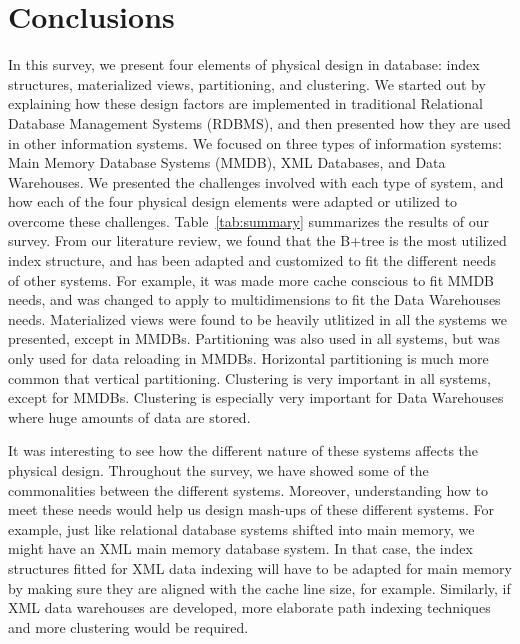 \documentclass[12pt,a4paper]{article}
\begin{document}
\section{Conclusions}
\label{SEC-CONCL}

In this survey, we present four elements of physical design in database: index structures, materialized views, partitioning, and clustering. We started out
by explaining how these design factors are implemented in traditional Relational Database Management Systems (RDBMS), and then presented how they are used in
other information systems. We focused on three types of information systems: Main Memory Database Systems (MMDB), XML Databases, and Data Warehouses. We
presented the challenges involved with each type of system, and how each of the four physical design elements were adapted or utilized to overcome these
challenges. Table~\ref{tab:summary} summarizes the results of our survey. From our literature review, we found that the B+tree is the most utilized index
structure, and has been adapted and customized to fit the different needs of other systems. For example, it was made more cache conscious to fit MMDB needs,
and was changed to apply to multidimensions to fit the Data Warehouses needs. Materialized views were found to be heavily utlitized in all the systems we
presented, except in MMDBs. Partitioning was also used in all systems, but was only used for data reloading in MMDBs. Horizontal partitioning is much more
common that vertical partitioning. Clustering is very important in all systems, except for MMDBs. Clustering is especially very important for Data Warehouses
where huge amounts of data are stored.

It was interesting to see how the different nature of these systems affects the physical design. Throughout the survey, we have showed some of the
commonalities between the different systems. Moreover, understanding how to meet these needs would help us design mash-ups of these different systems. For
example, just like relational database systems shifted into main memory, we might have an XML main memory database system. In that case, the index structures
fitted for XML data indexing will have to be adapted for main memory by making sure they are aligned with the cache line size, for example. Similarly, if XML
data warehouses are developed, more elaborate path indexing techniques and more clustering would be required. 







\end{document}
